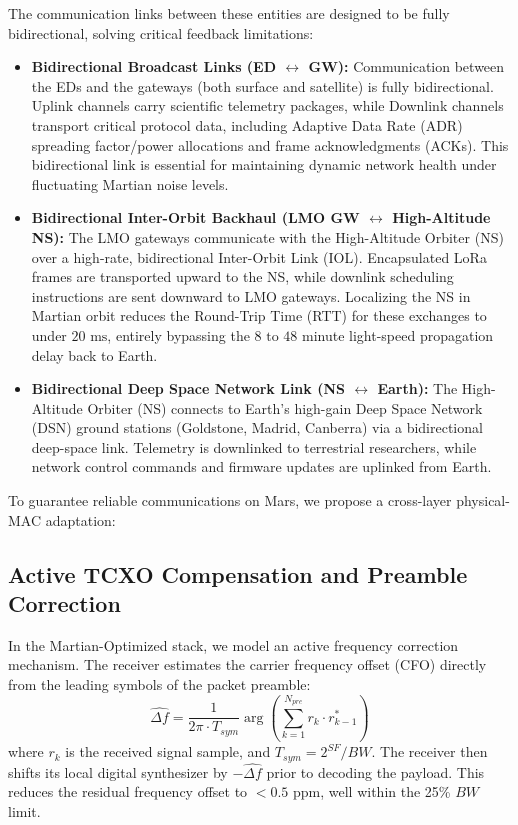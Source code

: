 \documentclass{ijuc}
\begin{document}
The communication links between these entities are designed to be fully bidirectional, solving critical feedback limitations:
\begin{itemize}
    \item \textbf{Bidirectional Broadcast Links (ED $\leftrightarrow$ GW):} Communication between the EDs and the gateways (both surface and satellite) is fully bidirectional. Uplink channels carry scientific telemetry packages, while Downlink channels transport critical protocol data, including Adaptive Data Rate (ADR) spreading factor/power allocations and frame acknowledgments (ACKs). This bidirectional link is essential for maintaining dynamic network health under fluctuating Martian noise levels.
    \item \textbf{Bidirectional Inter-Orbit Backhaul (LMO GW $\leftrightarrow$ High-Altitude NS):} The LMO gateways communicate with the High-Altitude Orbiter (NS) over a high-rate, bidirectional Inter-Orbit Link (IOL). Encapsulated LoRa frames are transported upward to the NS, while downlink scheduling instructions are sent downward to LMO gateways. Localizing the NS in Martian orbit reduces the Round-Trip Time (RTT) for these exchanges to under $20\text{ ms}$, entirely bypassing the $8\text{ to }48$ minute light-speed propagation delay back to Earth.
    \item \textbf{Bidirectional Deep Space Network Link (NS $\leftrightarrow$ Earth):} The High-Altitude Orbiter (NS) connects to Earth's high-gain Deep Space Network (DSN) ground stations (Goldstone, Madrid, Canberra) via a bidirectional deep-space link. Telemetry is downlinked to terrestrial researchers, while network control commands and firmware updates are uplinked from Earth.
\end{itemize}

To guarantee reliable communications on Mars, we propose a cross-layer physical-MAC adaptation:

\subsection{Active TCXO Compensation and Preamble Correction}
In the Martian-Optimized stack, we model an active frequency correction mechanism. The receiver estimates the carrier frequency offset (CFO) directly from the leading symbols of the packet preamble:
\begin{equation}
    \widehat{\Delta f} = \frac{1}{2\pi \cdot T_{sym}} \arg\left( \sum_{k=1}^{N_{pre}} r_k \cdot r_{k-1}^* \right)
\end{equation}
where $r_k$ is the received signal sample, and $T_{sym} = 2^{SF}/BW$. The receiver then shifts its local digital synthesizer by $-\widehat{\Delta f}$ prior to decoding the payload. This reduces the residual frequency offset to $< 0.5$ ppm, well within the 25\% $BW$ limit.
\end{document}
